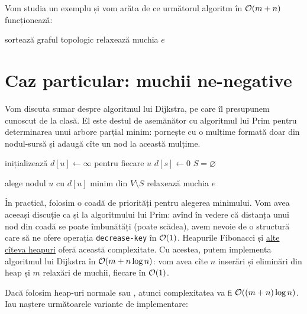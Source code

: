 \documentclass[../main.tex]{subfiles}
\begin{document}
Vom studia un exemplu și vom arăta de ce următorul algoritm în $\mathcal{O}(m + n)$ funcționează:

\begin{algorithm}[H]
  \caption{Calculul distanțelor minime într-un dag}
  \begin{algorithmic}[1]
    \State sortează graful topologic
        \State relaxează muchia $e$
      \EndFor
    \EndFor
  \end{algorithmic}
\end{algorithm}

\section{Caz particular: muchii ne-negative}

Vom discuta sumar despre algoritmul lui Dijkstra, pe care îl presupunem cunoscut de la clasă. El este destul de asemănător cu algoritmul lui Prim pentru determinarea unui arbore parțial minim: pornește cu o mulțime formată doar din nodul-sursă și adaugă cîte un nod la această mulțime.

\begin{algorithm}[H]
  \caption{Algoritmul lui Dijkstra}
  \begin{algorithmic}[1]
    \State inițializează $d[u] \gets \infty$ pentru fiecare $u$
    \State $d[s] \gets 0$
    \State $S = \varnothing$

      \State alege nodul $u$ cu $d[u]$ minim din $V \setminus S$
        \State relaxează muchia $e$
      \EndFor
    \EndFor
  \end{algorithmic}
\end{algorithm}

În practică, folosim o coadă de priorități pentru alegerea minimului. Vom avea aceeași discuție ca și la algoritmului lui Prim: avînd în vedere că distanța unui nod din coadă se poate îmbunătăți (poate scădea), avem nevoie de o structură care să ne ofere operația \texttt{decrease-key} în $\mathcal{O}(1)$. Heapurile Fibonacci și \href{https://en.wikipedia.org/wiki/Fibonacci_heap#Summary_of_running_times}{alte cîteva heapuri} oferă această complexitate. Cu acestea, putem implementa algoritmul lui Dijkstra în $\mathcal{O}(m + n \log n)$: vom avea cîte $n$ inserări și eliminări din heap și $m$ relaxări de muchii, fiecare în $\mathcal{O}(1)$.

Dacă folosim heap-uri normale sau , atunci complexitatea va fi $\mathcal{O}((m + n) \log n)$. Iau naștere următoarele variante de implementare:
\end{document}
